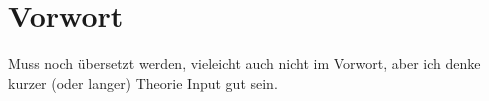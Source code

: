 %
%


\chapter{Vorwort}
  Muss noch übersetzt werden, vieleicht auch nicht im Vorwort, aber ich denke kurzer (oder langer) Theorie Input gut sein.

  
